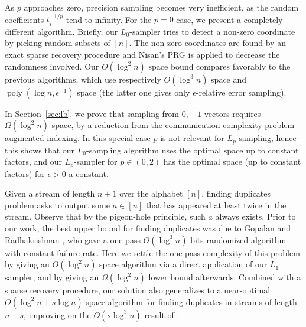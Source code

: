 \documentclass[9pt,letterpaper]{article}
\theoremstyle{remark}
\DeclareMathOperator{\poly}{poly}
\begin{document}
   As $p$ approaches zero, precision sampling becomes very inefficient, as
  the random coefficients $t_i^{-1/p}$ tend to infinity. For the $p=0$ case,
 we present a completely different algorithm. 
   Briefly, our $L_0$-sampler tries to 
   detect a non-zero
   coordinate by picking random subsets of $[n]$.
   The non-zero coordinates are found
   by an exact sparse recovery procedure and Nisan's PRG \cite{Nisan} 
   is applied to decrease the randomness involved.
   Our $O(\log^2 n)$ space bound compares favorably to the previous algorithms, which use respectively $O(\log^3 n)$ space \cite{FrahlingIS05} and $\poly(\log n,\epsilon^{-1})$  space \cite{MonemizadehW10} (the latter one gives only $\epsilon$-relative error sampling).

    In Section~\ref{sec:lb}, we prove that sampling from 0, $\pm1$
   vectors requires $\Omega(\log^2 n)$ space, by a reduction from 
   the communication complexity problem augmented indexing. 
   In this special case $p$ is not relevant for $L_p$-sampling, hence 
   this shows that our $L_0$-sampling algorithm uses the optimal space up to constant 
   factors, and our $L_p$-sampler for $p\in(0,2)$ has the optimal space (up to constant factors) for $\epsilon>0$ a constant. 

Given a stream of length $n+1$ over the alphabet $[n]$, finding
duplicates problem asks to output some $a\in[n]$ that has appeared
at least twice in the stream. Observe that by the pigeon-hole principle, 
such $a$ always exists. Prior to our work, the best upper bound
for finding duplicates was due to  Gopalan
and Radhakrishnan \cite{GopalanJaikumar}, who gave a one-pass $O(\log^3
n)$ bits randomized algorithm with constant failure rate.
Here we settle the one-pass complexity of this problem by 
giving an $O(\log^2 n)$ space algorithm via a direct application of our $L_1$
sampler, and by giving an $\Omega(\log^2 n)$ lower bound afterwards. Combined with a sparse recovery procedure,
our solution also generalizes to a near-optimal $O(\log^2n+s\log n)$ space
algorithm for finding duplicates in streams of length $n-s$, improving on the $O(s\log^3 n)$ result of \cite{GopalanJaikumar}.
  
\end{document}
